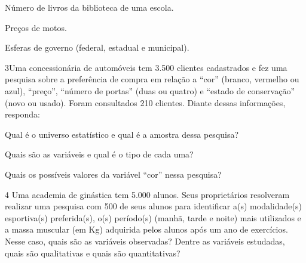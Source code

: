 {\begin{escolha}

\item
  Número de livros da biblioteca de uma escola.


\item
  Preços de motos.


\item
  Esferas de governo (federal, estadual e municipal).

\end{escolha}


\num{3}Uma concessionária de automóveis tem 3.500 clientes cadastrados e
fez uma pesquisa sobre a preferência de compra em relação a ``cor''
(branco, vermelho ou azul), ``preço'', ``número de portas'' (duas ou
quatro) e ``estado de conservação'' (novo ou usado). Foram consultados
210 clientes. Diante dessas informações, responda:

\begin{escolha}
\item
  Qual é o universo estatístico e qual é a amostra dessa pesquisa?


\item
  Quais são as variáveis e qual é o tipo de cada uma?


\item
  Quais os possíveis valores da variável ``cor'' nessa pesquisa?

\end{escolha}


\num{4} Uma academia de ginástica tem 5.000 alunos. Seus proprietários
resolveram realizar uma pesquisa com 500 de seus alunos para identificar
a(s) modalidade(s) esportiva(s) preferida(s), o(s) período(s) (manhã,
tarde e noite) mais utilizados e a massa muscular (em Kg) adquirida
pelos alunos após um ano de exercícios. Nesse caso, quais são as
variáveis observadas? Dentre as variáveis estudadas, quais são
qualitativas e quais são quantitativas?

}
